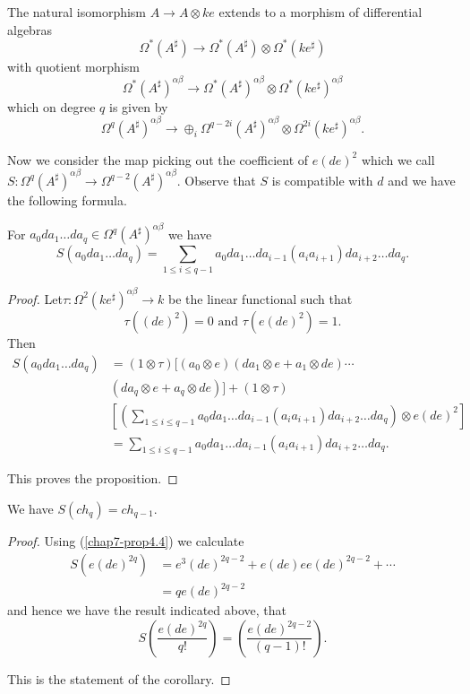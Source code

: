 \begin{remark}\label{chap7-rem4.3}
The natural isomorphism $A\to A\otimes ke$ extends to a morphism of
differential algebras
$$
\Omega^{*}(A^{\sharp})\to \Omega^{*}(A^{\sharp})\otimes
\Omega^{*}(ke^{\sharp})
$$
with quotient morphism
$$
\Omega^{*}(A^{\sharp})^{\alpha\beta}\to
\Omega^{*}(A^{\sharp})^{\alpha\beta}\otimes
\Omega^{*}(ke^{\sharp})^{\alpha\beta}
$$
which on degree $q$ is given by
$$
\Omega^{q}(A^{\sharp})^{\alpha\beta}\to
\oplus_{i}\Omega^{q-2i}(A^{\sharp})^{\alpha\beta}\otimes
\Omega^{2i}(ke^{\sharp})^{\alpha\beta}. 
$$

Now we consider the map picking out the coefficient of $e(de)^{2}$
which we call $S:\Omega^{q}(A^{\sharp})^{\alpha\beta}\to
\Omega^{q-2}(A^{\sharp})^{\alpha\beta}$. Observe that $S$ is
compatible with $d$ and we have the following formula.
\end{remark}

\begin{proposition}\label{chap7-prop4.4}
For $a_{0}da_{1}\ldots da_{q}\in \Omega^{q}(A^{\sharp})^{\alpha\beta}$
we have
$$
S(a_{0}da_{1}\ldots da_{q})=\sum_{1\leq i\leq q-1}a_{0}da_{1}\ldots
da_{i-1}(a_{i}a_{i+1})da_{i+2}\ldots da_{q}. 
$$
\end{proposition}

\begin{proof}
Let\pageoriginale $\tau:\Omega^{2}(ke^{\sharp})^{\alpha\beta}\to k$ be the linear
functional such that 
$$\tau((de)^{2})=0 \mbox{ and } \tau(e(de)^{2})=1.$$ 
Then
\begin{align*}
S(a_{0}da_{1}\ldots da_{q}) &= (1\otimes\tau)[(a_{0}\otimes
  e)(da_{1}\otimes e+a_{1}\otimes de)\cdots\\ 
&(da_{q}\otimes e+a_{q}\otimes de)]
 +(1\otimes \tau)\\ 
&\left[\left(\sum_{1\leq i\leq q-1}a_{0}da_{1}\ldots
  da_{i-1}(a_{i}a_{i+1})da_{i+2}\ldots da_{q}\right)\otimes e(de)^{2}\right]\\
&= \sum_{1\leq i\leq q-1}a_{0}da_{1}\ldots
da_{i-1}(a_{i}a_{i+1})da_{i+2}\ldots da_{q}. 
\end{align*}

This proves the proposition.
\end{proof}

\begin{corollary}\label{chap7-prop4.5}
We have $S(ch_{q})=ch_{q-1}$.
\end{corollary}

\begin{proof}
Using (\ref{chap7-prop4.4}) we calculate
\begin{align*}
S(e(de)^{2q}) &= e^{3}(de)^{2q-2}+e(de)ee(de)^{2q-2}+\cdots\\
&= qe(de)^{2q-2}
\end{align*}
and hence we have the result indicated above, that
$$
S\left(\frac{e(de)^{2q}}{q!}\right)=\left(\frac{e(de)^{2q-2}}{(q-1)!}\right). 
$$

This is the statement of the corollary.
\end{proof}

